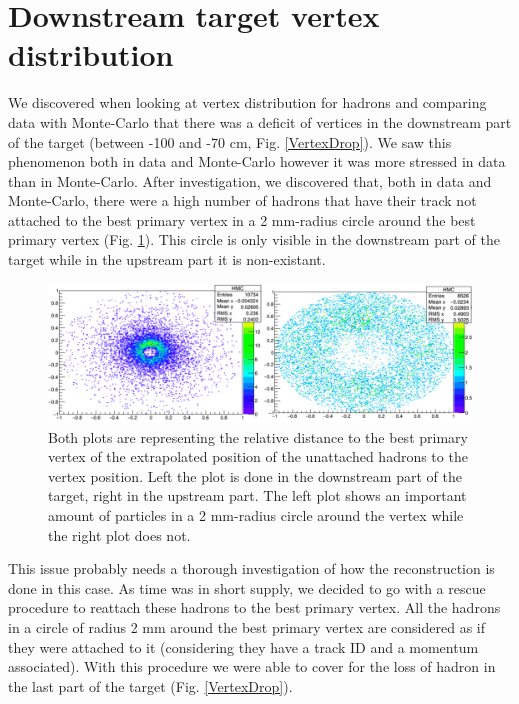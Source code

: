
\section{Downstream target vertex distribution}

We discovered when looking at vertex distribution for hadrons and comparing data with Monte-Carlo that there was a deficit of vertices in the downstream part of the target (between -100 and -70 cm, Fig. \ref{VertexDrop}). We saw this phenomenon both in data and Monte-Carlo however it was more stressed in data than in Monte-Carlo. After investigation, we discovered that, both in data and Monte-Carlo, there were a high number of hadrons that have their track not attached to the best primary vertex in a 2 mm-radius circle around the best primary vertex (Fig. \ref{CircleHadron}). This circle is only visible in the downstream part of the target while in the upstream part it is non-existant.

\begin{figure}[!h]
	\includegraphics[scale=0.45]{./gfx/CircleHadron.png}
	\caption{Both plots are representing the relative distance to the best primary vertex of the extrapolated position of the unattached hadrons to the vertex position. Left the plot is done in the downstream part of the target, right in the upstream part. The left plot shows an important amount of particles in a 2 mm-radius circle around the vertex while the right plot does not.}
	\label{CircleHadron}
\end{figure}

This issue probably needs a thorough investigation of how the reconstruction is done in this case. As time was in short supply, we decided to go with a rescue procedure to reattach these hadrons to the best primary vertex. All the hadrons in a circle of radius 2 mm around the best primary vertex are considered as if they were attached to it (considering they have a track ID and a momentum associated). With this procedure we were able to cover for the loss of hadron in the last part of the target (Fig. \ref{VertexDrop}).

